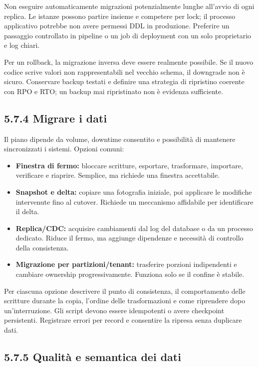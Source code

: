 \documentclass[
  italian,
  10pt,
]{book}
\providecommand{\tightlist}{%
  \setlength{\itemsep}{0pt}\setlength{\parskip}{0pt}}
\begin{document}
Non eseguire automaticamente migrazioni potenzialmente lunghe all'avvio
di ogni replica. Le istanze possono partire insieme e competere per
lock; il processo applicativo potrebbe non avere permessi DDL in
produzione. Preferire un passaggio controllato in pipeline o un job di
deployment con un solo proprietario e log chiari.

Per un rollback, la migrazione inversa deve essere realmente possibile.
Se il nuovo codice scrive valori non rappresentabili nel vecchio schema,
il downgrade non è sicuro. Conservare backup testati e definire una
strategia di ripristino coerente con RPO e RTO; un backup mai
ripristinato non è evidenza sufficiente.

\subsection{5.7.4 Migrare i dati}\label{migrare-i-dati}

Il piano dipende da volume, downtime consentito e possibilità di
mantenere sincronizzati i sistemi. Opzioni comuni:

\begin{itemize}
\tightlist
\item
  \textbf{Finestra di fermo:} bloccare scritture, esportare,
  trasformare, importare, verificare e riaprire. Semplice, ma richiede
  una finestra accettabile.
\item
  \textbf{Snapshot e delta:} copiare una fotografia iniziale, poi
  applicare le modifiche intervenute fino al cutover. Richiede un
  meccanismo affidabile per identificare il delta.
\item
  \textbf{Replica/CDC:} acquisire cambiamenti dal log del database o da
  un processo dedicato. Riduce il fermo, ma aggiunge dipendenze e
  necessità di controllo della consistenza.
\item
  \textbf{Migrazione per partizioni/tenant:} trasferire porzioni
  indipendenti e cambiare ownership progressivamente. Funziona solo se
  il confine è stabile.
\end{itemize}

Per ciascuna opzione descrivere il punto di consistenza, il
comportamento delle scritture durante la copia, l'ordine delle
trasformazioni e come riprendere dopo un'interruzione. Gli script devono
essere idempotenti o avere checkpoint persistenti. Registrare errori per
record e consentire la ripresa senza duplicare dati.

\subsection{5.7.5 Qualità e semantica dei
dati}\label{qualituxe0-e-semantica-dei-dati}
\end{document}
